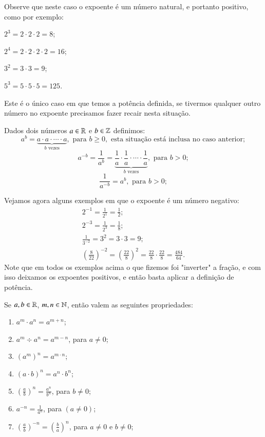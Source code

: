  \vskip0.3cm

 \begin{exem}
 Observe que neste caso o expoente é um número natural, e portanto positivo, como por exemplo:

  $2^3= 2 \cdot 2 \cdot 2= 8$;

  $2^4=2 \cdot 2 \cdot 2 \cdot  2= 16$;

  $3^2= 3 \cdot 3= 9$;

  $5^3= 5 \cdot 5 \cdot 5= 125$.

  Este é o único caso em que temos a potência definida, se tivermos qualquer outro número no expoente precisamos fazer recair nesta situação.
 \end{exem}


 \vskip0.3cm

 \colorbox{azul}{
 \begin{minipage}{0.9\linewidth}
 \begin{center}
   Dados dois números $a \in \mathbb{R}$ e $b \in \mathbb{Z}$ definimos:
 \[a^b= \underbrace{a \cdot a \cdot \cdots \cdot a}_{b \text{ vezes}}, \text{ para } b\geq0, \text{ esta situação está inclusa no caso anterior};\]
 \[a^{-b}= \frac{1}{a^b}= \underbrace{\frac{1}{a} \cdot \frac{1}{a} \cdot \cdots \cdot \frac{1}{a}}_{b \text{ vezes}}, \text{ para } b>0 ;\]
 \[\frac{1}{a^{-b}}= a^b, \text{ para } b>0;\]
 \end{center}
 \end{minipage}}

 \vskip0.3cm

 \begin{exem}
 Vejamos agora alguns exemplos em que o expoente é um número negativo:
 \begin{eqnarray*}
  2^{-1}= \frac{1}{2^{1}}= \frac{1}{2}; \\
  2^{-3}= \frac{1}{2^3}= \frac{1}{8}; \\
  \frac{1}{3^{-2}}= 3^2= 3 \cdot 3= 9; \\
  \left( \frac{8}{22} \right)^{-2}= \left( \frac{22}{8} \right)^{2}= \frac{22}{8} \cdot \frac{22}{8}= \frac{484}{64}.
 \end{eqnarray*}
 Note que em todos os exemplos acima o que fizemos foi "inverter" a fração, e com isso deixamos os expoentes positivos, e então basta aplicar a definição de potência.

 \end{exem}

 
 Se $a, b \in \mathbb{R}$, $m, n \in \mathbb{N}$, então valem as seguintes propriedades:
 \begin{enumerate}[P1)]
 \item $a^m \cdot a^n= a^{m + n}$;
 \item $a^m \div a^n= a^{m - n}$, para $a \neq 0$;
 \item $(a^m)^n= a^{m \cdot n}$;
 \item $(a \cdot b)^n= a^n \cdot b^n$;
 \item $\left(\frac{a}{b}\right)^n= \frac{a^n}{b^n}$, para $b \neq 0$;
 \item $a^{-n}= \frac{1}{a^n}$, para $(a \neq 0)$;
 \item $\left(\frac{a}{b} \right)^{-n}= \left(\frac{b}{a} \right)^{n}$, para $a \neq 0$ e $b \neq 0$;
 \end{enumerate}
 
